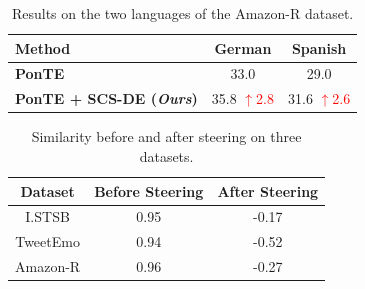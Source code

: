 \documentclass[11pt]{article}
\newcommand{\up}[1]{\textcolor{red}{{$\uparrow$#1}}}
\begin{document}
\begin{table}[t]
    \centering
    \setlength{\tabcolsep}{2pt}
    \begin{tabular}{lcc}
        \toprule
        \textbf{Method} & \textbf{German} & \textbf{Spanish} \\
        \midrule
        \textbf{PonTE}  & 33.0 & 29.0  \\
        \textbf{\textbf{PonTE + SCS-DE (\textbf{\textit{Ours}})} } & 35.8 \up{2.8}  & 31.6 \up{2.6} \\
        \bottomrule
    \end{tabular}
    \caption{Results on the two languages of the Amazon-R dataset.}
    \label{tab:other_language}
\end{table}

\begin{table}[t]
    \centering
    \setlength{\tabcolsep}{4pt}
    \begin{tabular}{ccc}
        \toprule
        \textbf{Dataset} & \textbf{Before Steering} & \textbf{After Steering} \\
        \midrule
        I.STSB  & 0.95 & -0.17  \\
        TweetEmo  & 0.94 & -0.52  \\
        Amazon-R & 0.96    & -0.27        \\
        \bottomrule
    \end{tabular}
    \caption{Similarity before and after steering on three datasets.}
    \label{tab:cos}
\end{table}
\end{document}
